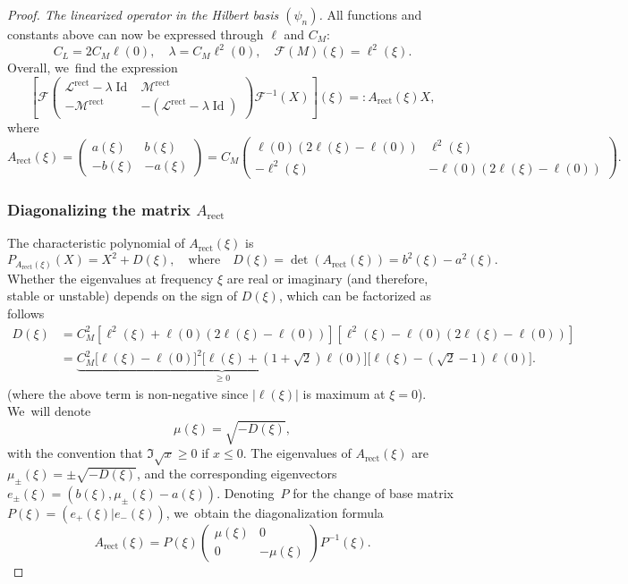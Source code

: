 \documentclass[JEP,XML,SOM,Unicode,NoFloatCountersInSection,published]{cedram}
\DeclareMathOperator{\Id}{Id}
\theoremstyle{definition}
\newcommand{\pa}[1]{\left(#1\right)}
\newcommand{\pac}[1]{\left[#1\right]}
\newcommand{\bpac}[1]{\bigl[#1\bigr]}
\begin{document}
\begin{proof}[Proof. The linearized operator in the Hilbert basis $(\psi_n)$]
All functions and constants above can now be expressed through $\ell$ and $C_M$:
\[
C_L = 2 C_M \ell(0), \quad \lambda = C_M \ell^2(0), \quad \mathcal{F}(M)(\xi) = \ell^2(\xi).
\]
Overall, we~find the expression
\begin{equation*}
\pac{\mathcal{F}\begin{pmatrix} \mathcal{L}^{\mathrm{rect}}-\lambda \Id & \mathcal{M}^{\mathrm{rect}} \\[2pt] -\mathcal{M}^{\mathrm{rect}} & - (\mathcal{L}^{\mathrm{rect}}-\lambda \Id) \end{pmatrix}\mathcal{F}^{-1}(X)}\pa{\xi} =:A_{\mathrm{rect}}(\xi)X,
\end{equation*}
where
\begin{equation*}
A_{\mathrm{rect}}(\xi) = \begin{pmatrix} a(\xi) & b(\xi) \\[2pt] -b(\xi) & -a(\xi) \end{pmatrix} =C_M \begin{pmatrix} \ell(0)(2\ell(\xi)-\ell(0)) & \ell^2(\xi) \\[2pt] -\ell^2(\xi) & -\ell(0)(2\ell(\xi)-\ell(0)) \end{pmatrix}.
\end{equation*}

\subsubsection*{Diagonalizing the matrix $A_{\mathrm{rect}}$}
The characteristic polynomial of $A_{\mathrm{rect}}(\xi)$ is
\[
P_{A_{\mathrm{rect}}(\xi)}(X) = X^2 + D(\xi), \quad \text{where} \quad D(\xi) = \det(A_{\mathrm{rect}}(\xi)) = b^2(\xi) - a^2(\xi).
\]
Whether the eigenvalues at frequency $\xi$ are real or imaginary (and therefore, stable or unstable) depends on the sign of $D(\xi)$, which can be factorized as follows
\begin{align*}
D(\xi) &= C_M^2\pac{\ell^2(\xi)+\ell(0)(2\ell(\xi)-\ell(0))}\pac{\ell^2(\xi)-\ell(0)(2\ell(\xi)-\ell(0))} \\
&= \underbrace{C_M^2\bpac{\ell(\xi)-\ell(0)}^2\bpac{\ell(\xi)+(1+\sqrt{2})\ell(0)}}_{\geq 0}\bpac{\ell(\xi)-(\sqrt{2}-1)\ell(0)}.
\end{align*}
(where the above term is non-negative since $|\ell(\xi)|$ is maximum at $\xi=0$). We~will denote
\[
\mu(\xi) = \sqrt{-D(\xi)},
\]
with the convention that $\Im  \sqrt x \geq 0$ if $x \leq 0$. The eigenvalues of $A_{\mathrm{rect}}(\xi)$ are $\mu_{\pm} (\xi)= \pm \sqrt{-D(\xi)}$, and the corresponding eigenvectors $e_{\pm}(\xi) = (b(\xi), \mu_{\pm}(\xi) - a(\xi))$. Denoting~$P$ for the change of base matrix $P(\xi) = (e_+(\xi) | e_-(\xi))$, we~obtain the diagonalization formula
\[
A_{\mathrm{rect}}(\xi) = P(\xi) \begin{pmatrix} \mu(\xi) & 0 \\ 0 & -\mu(\xi) \end{pmatrix} P^{-1}(\xi).
\]

\end{proof}
\end{document}
